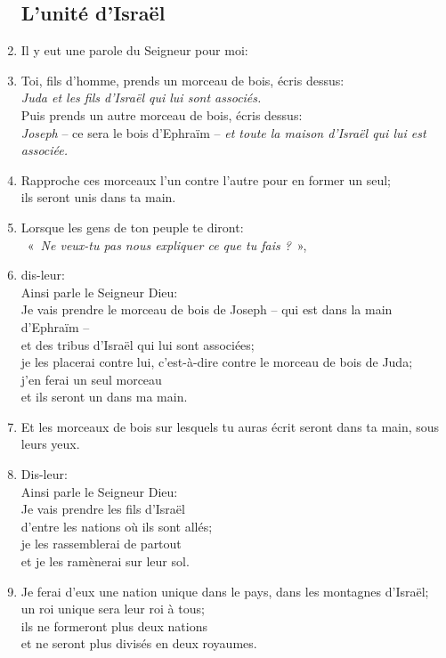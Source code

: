 \begin{enumerate}[leftmargin=\psleftmargin, labelsep = \pslabelsep, label={\arabic*}, font=\color{\pscolor}\small\textsuperscript, parsep=0em, itemsep=0em, topsep=0em ]
          \subsection*{L'unité d'Israël}
    \item Il y eut une parole du Seigneur pour moi:
    \item Toi, fils d’homme, prends un morceau de bois, écris dessus: \\
          \decalage \textit{Juda et les fils d’Israël qui lui sont associés.} \\ Puis prends un autre morceau de bois, écris dessus: \\ \decalage \textit{Joseph} – ce sera le bois d’Ephraïm – \textit{et toute la maison d’Israël qui lui est associée.}
    \item Rapproche ces morceaux l’un contre l’autre pour en former un seul; \\ ils seront unis dans ta main.
    \item Lorsque les gens de ton peuple te diront: \\ \decalage «~\textit{Ne veux-tu pas nous expliquer ce que tu fais ?}~»,
    \item dis-leur: \\ Ainsi parle le Seigneur Dieu: \\
          Je vais prendre le morceau de bois de Joseph – qui est dans la main d’Ephraïm – \\ et des tribus d’Israël qui lui sont associées; \\ je les placerai contre lui, c’est-à-dire contre le morceau de bois de Juda; \\ j’en ferai un seul morceau \\ et ils seront un dans ma main.
    \item Et les morceaux de bois sur lesquels tu auras écrit seront dans ta main, sous leurs yeux.
    \item Dis-leur: \\ Ainsi parle le Seigneur Dieu: \\ Je vais prendre les fils d’Israël \\ d’entre les nations où ils sont allés; \\ je les rassemblerai de partout \\ et je les ramènerai sur leur sol.
    \item Je ferai d’eux une nation unique dans le pays, dans les montagnes d’Israël; \\ un roi unique sera leur roi à tous; \\ ils ne formeront plus deux nations \\ et ne seront plus divisés en deux royaumes.

\end{enumerate}

